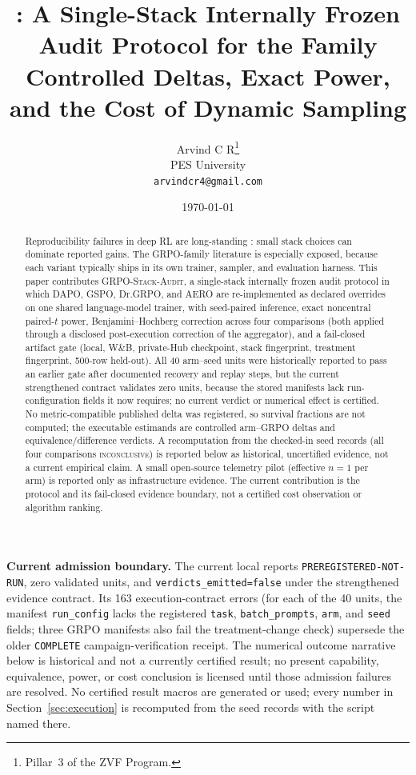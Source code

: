 \documentclass[11pt]{article}
\title{\audit{}: A Single-Stack Internally Frozen Audit Protocol for the \grpo{} Family\\
\large Controlled Deltas, Exact Power, and the Cost of Dynamic Sampling}
\author{Arvind C R\thanks{Pillar~3 of the ZVF Program.}\\
PES University\\\texttt{arvindcr4@gmail.com}}
\date{\today}
\newcommand{\verdict}[1]{\textsc{#1}}
\newcommand{\grpo}{\textsc{GRPO}}
\newcommand{\audit}{\textsc{GRPO-Stack-Audit}}
\begin{document}
\maketitle

\begin{abstract}
Reproducibility failures in deep RL are long-standing
\cite{henderson2018deep,hu2024openrlhf}: small stack choices can dominate
reported gains. The \grpo{}-family literature is especially exposed, because
each variant typically ships in its own trainer, sampler, and evaluation
harness. This paper contributes \audit{}, a single-stack internally frozen audit
protocol in which DAPO, GSPO, Dr.\grpo{}, and AERO are re-implemented as
declared overrides on one shared language-model trainer, with seed-paired
inference, exact noncentral paired-$t$ power, Benjamini--Hochberg correction
across four comparisons (both applied through a disclosed post-execution
correction of the aggregator), and a fail-closed artifact gate (local, W\&B,
private-Hub checkpoint, stack fingerprint, treatment fingerprint, 500-row
held-out). All 40 arm--seed units were historically reported to pass an
earlier gate after documented recovery and replay steps, but the current
strengthened contract validates zero units, because the stored manifests lack
run-configuration fields it now requires; no current verdict or numerical
effect is certified. No metric-compatible published delta was registered, so
survival fractions are not computed; the executable estimands are controlled
arm--GRPO deltas and equivalence/difference verdicts. A recomputation from the
checked-in seed records (all four comparisons \verdict{inconclusive}) is
reported below as historical, uncertified evidence, not a current empirical
claim.
A small open-source
telemetry pilot (effective $n{=}1$ per arm) is reported only as infrastructure
evidence. The current contribution is the protocol and its fail-closed
evidence boundary, not a certified cost observation or algorithm ranking.
\end{abstract}
\begin{sloppypar}\noindent\textbf{Current admission boundary.} The current local
 reports \texttt{PREREGISTERED-NOT-RUN}, zero
validated units, and \texttt{verdicts\_emitted=false} under the strengthened
evidence contract. Its 163 execution-contract errors (for each of the 40
units, the manifest \texttt{run\_config} lacks the registered \texttt{task},
\texttt{batch\_prompts}, \texttt{arm}, and \texttt{seed} fields; three GRPO
manifests also fail the treatment-change check) supersede the older
\texttt{COMPLETE} campaign-verification receipt. The numerical outcome narrative
below is historical and not a currently certified result; no present
capability, equivalence, power, or cost conclusion is licensed until those
admission failures are resolved. No certified result macros are generated or
used; every number in Section~\ref{sec:execution} is recomputed from the seed
records with the script named there.\end{sloppypar}
\end{document}
